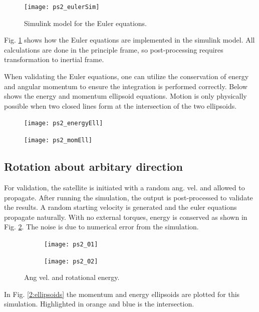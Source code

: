 \documentclass[12pt, letterpaper]{article}
\begin{document}
\begin{figure}[H]
	\centering
	\texttt{[image: ps2\_eulerSim]}
	\caption{Simulink model for the Euler equations.}
	\label{2:eulerSim}
\end{figure}

Fig. \ref{2:eulerSim} shows how the Euler equations are implemented in the simulink model. All calculations are done in the principle frame, so post-processing requires transformation to inertial frame. 

When validating the Euler equations, one can utilize the conservation of energy and angular momentum to ensure the integration is performed correctly. Below shows the energy and momentum ellipsoid equations. Motion is only physically possible when two closed lines form at the intersection of the two ellipsoids.

\begin{figure}[H]
	\centering
	\texttt{[image: ps2\_energyEll]}
\end{figure}


\begin{figure}[H]
	\centering
	\texttt{[image: ps2\_momEll]}
\end{figure}


\subsection{Rotation about arbitary direction}

For validation, the satellite is initiated with a random ang. vel. and allowed to propagate. After running the simulation, the output is post-processed to validate the results. A random starting velocity is generated and the euler equations propagate naturally. With no external torques, energy is conserved as shown in Fig. \ref{(2:angVelEnergy)}. The noise is due to numerical error from the simulation.

\begin{figure}[H]
	\centering
	\begin{subfigure}[b]{0.49\textwidth}
		\texttt{[image: ps2\_01]}
	\end{subfigure}
	\begin{subfigure}[b]{0.49\textwidth}
		\texttt{[image: ps2\_02]}
	\end{subfigure}
	\caption{Ang vel. and rotational energy.}
	\label{(2:angVelEnergy)}
\end{figure}

In Fig. \ref{2:ellipsoids} the momentum and energy ellipsoids are plotted for this simulation. Highlighted in orange and blue is the intersection. 
\end{document}
